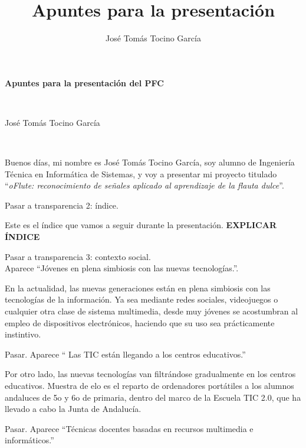 \documentclass[landscape]{article}
\title{Apuntes para la presentación}
\author{José Tomás Tocino García}
\date{}
\newenvironment{nota}
{%
\begin{framed} \noindent\itshape
}
{%
\end{framed}\vspace{-0.5cm} }
\begin{document}
\pagestyle{empty}
\begin{multicols*}{2}

\begin{center}
  \begin{Large}\textbf{Apuntes para la presentación del PFC}\end{Large}\\
  \begin{large}José Tomás Tocino García\end{large}\\[0.1cm]
\end{center}

Buenos días, mi nombre es José Tomás Tocino García, soy alumno de Ingeniería
Técnica en Informática de Sistemas, y voy a presentar mi proyecto titulado
``\textit{oFlute: reconocimiento de señales aplicado al aprendizaje de la flauta
  dulce}''.

\begin{nota}
  Pasar a transparencia 2: índice.
\end{nota}

Este es el índice que vamos a seguir durante la presentación. \textbf{EXPLICAR
  ÍNDICE}

\begin{nota}
  Pasar a transparencia 3: contexto social. \\Aparece ``Jóvenes en plena simbiosis con
  las nuevas tecnologías.''.
\end{nota}

En la actualidad, las nuevas generaciones están en plena simbiosis con las
tecnologías de la información. Ya sea mediante redes sociales, videojuegos o
cualquier otra clase de sistema multimedia, desde muy jóvenes se acostumbran al
empleo de dispositivos electrónicos, haciendo que su uso sea prácticamente
instintivo.

\begin{nota}
  Pasar. Aparece `` Las TIC están llegando a los centros educativos.''
\end{nota}

Por otro lado, las nuevas tecnologías van filtrándose gradualmente en los
centros educativos. Muestra de elo es el reparto de ordenadores portátiles a los
alumnos andaluces de 5o y 6o de primaria, dentro del marco de la Escuela TIC
2.0, que ha llevado a cabo la Junta de Andalucía.

\begin{nota}
  Pasar. Aparece ``Técnicas docentes basadas en recursos multimedia e informáticos.''
\end{nota}


\end{multicols*}
\end{document}
